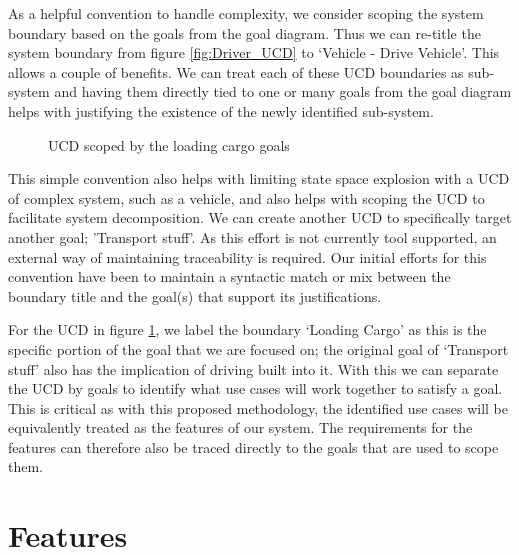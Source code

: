 As a helpful convention to handle complexity, we consider scoping the system boundary based on the goals from the goal diagram. Thus we can re-title the system boundary from figure \ref{fig:Driver_UCD} to `Vehicle - Drive Vehicle'. This allows a couple of benefits. We can treat each of these \ac{UCD} boundaries as sub-system and having them directly tied to one or many goals from the goal diagram helps with justifying the existence of the newly identified sub-system.

\begin{figure}
	\centering
	
	\caption{\ac{UCD} scoped by the loading cargo goals}
	\label{fig:Cargo_UCD}
\end{figure}

This simple convention also helps with limiting state space explosion with a \ac{UCD} of complex system, such as a vehicle, and also helps with scoping the \ac{UCD} to facilitate system decomposition. We can create another \ac{UCD} to specifically target another goal; 'Transport stuff'. As this effort is not currently tool supported, an external way of maintaining traceability is required. Our initial efforts for this convention have been to maintain a syntactic match or mix between the boundary title and the goal(s) that support its justifications.

For the \ac{UCD} in figure \ref{fig:Cargo_UCD}, we label the boundary `Loading Cargo' as this is the specific portion of the goal that we are focused on; the original goal of `Transport stuff' also has the implication of driving built into it. With this we can separate the \ac{UCD} by goals to identify what use cases will work together to satisfy a goal. This is critical as with this proposed methodology, the identified use cases will be equivalently treated as the features of our system. The requirements for the features can therefore also be traced directly to the goals that are used to scope them. 

\section{Features}
\label{sec:features}

